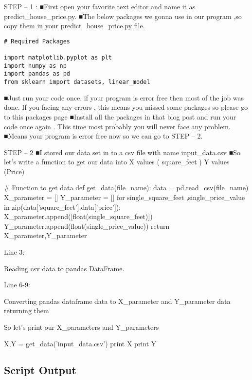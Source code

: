 STEP – 1 :
 ■First open your favorite text editor and name it as predict_house_price.py.
 ■The below packages we gonna use in our program ,so  copy them in your predict_house_price.py file.
 

\begin{framed}
\begin{verbatim}
# Required Packages

import matplotlib.pyplot as plt
import numpy as np
import pandas as pd
from sklearn import datasets, linear_model
\end{verbatim}


 ■Just run your code once. if your program is error free then most of the job was done. If you facing  any errors , this means you missed some  packages so please go to this packages page  
 ■Install all the packages in that blog post and run your code once again . This time most probably you will never face any problem.
 ■Means your program is error free now so we can go to STEP – 2.

STEP – 2
 ■I stored our data set in to a csv file with name input_data.csv
 ■So let’s write a function to get our data into X values ( square_feet  ) Y values (Price)
 
# Function to get data
def get_data(file_name):
 data = pd.read_csv(file_name)
 X_parameter = []
 Y_parameter = []
 for single_square_feet ,single_price_value in zip(data['square_feet'],data['price']):
       X_parameter.append([float(single_square_feet)])
       Y_parameter.append(float(single_price_value))
 return X_parameter,Y_parameter
 
Line 3:
 
Reading csv data to pandas DataFrame.
 
Line 6-9:
 
Converting pandas dataframe data to X_parameter and Y_parameter data returning them
 
So let’s print our X_parameters and Y_parameters
 
X,Y = get_data('input_data.csv')
print X
print Y

\subsection*{Script Output}


\end{framed}
